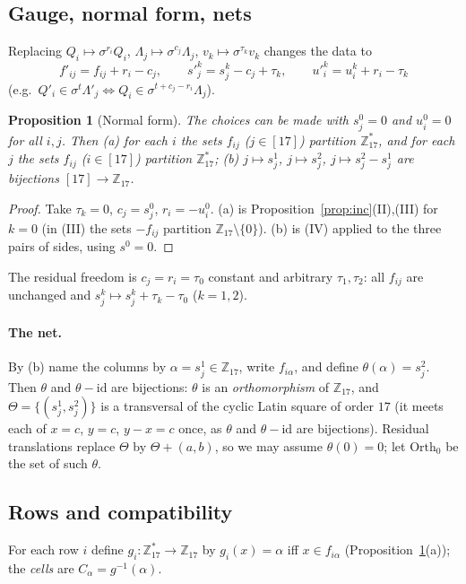 \documentclass[11pt,a4paper]{article}
\newtheorem{proposition}[theorem]{Proposition}
\theoremstyle{definition}
\newcommand{\Zp}{\mathbb{Z}_{17}}
\newcommand{\Zs}{\mathbb{Z}_{17}^{*}}
\newcommand{\Orth}{\mathrm{Orth}}
\begin{document}
\subsection{Gauge, normal form, nets}

Replacing $Q_i\mapsto\sigma^{r_i}Q_i$, $\Lambda_j\mapsto\sigma^{c_j}\Lambda_j$, $v_k\mapsto\sigma^{\tau_k}v_k$ changes the data to
\[f'_{ij}=f_{ij}+r_i-c_j,\qquad s'^k_j=s^k_j-c_j+\tau_k,\qquad u'^k_i=u^k_i+r_i-\tau_k\]
(e.g.\ $Q'_i\in\sigma^t\Lambda'_j\iff Q_i\in\sigma^{t+c_j-r_i}\Lambda_j$).

\begin{proposition}[Normal form]\label{prop:normal}
The choices can be made with $s^0_j=0$ and $u^0_i=0$ for all $i,j$. Then
(a) for each $i$ the sets $f_{ij}$ ($j\in[17]$) partition $\Zs$, and for each $j$ the sets $f_{ij}$ ($i\in[17]$) partition $\Zs$;
(b) $j\mapsto s^1_j$, $j\mapsto s^2_j$, $j\mapsto s^2_j-s^1_j$ are bijections $[17]\to\Zp$.
\end{proposition}
\begin{proof}
Take $\tau_k=0$, $c_j=s^0_j$, $r_i=-u^0_i$. (a) is Proposition~\ref{prop:inc}(II),(III) for $k=0$ (in (III) the sets $-f_{ij}$ partition $\Zp\setminus\{0\}$). (b) is (IV) applied to the three pairs of sides, using $s^0=0$.
\end{proof}
The residual freedom is $c_j=r_i=\tau_0$ constant and arbitrary $\tau_1,\tau_2$: all $f_{ij}$ are unchanged and $s^k_j\mapsto s^k_j+\tau_k-\tau_0$ ($k=1,2$).

\paragraph{The net.} By (b) name the columns by $\alpha=s^1_j\in\Zp$, write $f_{i\alpha}$, and define $\theta(\alpha)=s^2_j$. Then $\theta$ and $\theta-\mathrm{id}$ are bijections: $\theta$ is an \emph{orthomorphism} of $\Zp$, and $\Theta=\{(s^1_j,s^2_j)\}$ is a transversal of the cyclic Latin square of order $17$ (it meets each of $x=c$, $y=c$, $y-x=c$ once, as $\theta$ and $\theta-\mathrm{id}$ are bijections). Residual translations replace $\Theta$ by $\Theta+(a,b)$, so we may assume $\theta(0)=0$; let $\Orth_0$ be the set of such $\theta$.

\subsection{Rows and compatibility}

For each row $i$ define $g_i:\Zs\to\Zp$ by $g_i(x)=\alpha$ iff $x\in f_{i\alpha}$ (Proposition~\ref{prop:normal}(a)); the \emph{cells} are $C_\alpha=g^{-1}(\alpha)$.
\end{document}
